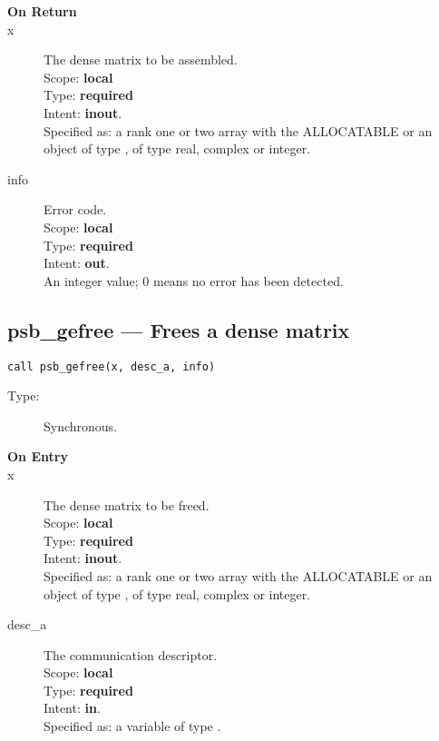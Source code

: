 \begin{description}
\item[\bf On Return]
\item[x] The dense matrix to be assembled.\\
Scope: {\bf local} \\
Type: {\bf required}\\
Intent: {\bf inout}.\\
Specified as: a rank one or two array with the ALLOCATABLE or an
object of type \vdata, of type real, complex or integer.\\
\item[info] Error code.\\
Scope: {\bf local} \\
Type: {\bf required} \\
Intent: {\bf out}.\\
An integer value; 0 means no error has been detected. 
\end{description}
%
%
\clearpage\subsection{psb\_gefree --- Frees a dense matrix}

\begin{verbatim}
call psb_gefree(x, desc_a, info)
\end{verbatim}

\begin{description}
\item[Type:] Synchronous.
\item[\bf On Entry]
\item[x] The dense matrix to
  be freed.\\
Scope: {\bf local} \\
Type: {\bf required}\\
Intent: {\bf inout}.\\
Specified as: a rank one or two array with the ALLOCATABLE or an
object of type \vdata, of type real, complex or integer.\\

\item[desc\_a] The communication descriptor.\\
Scope: {\bf local} \\
Type: {\bf required}\\
Intent: {\bf in}.\\
Specified as: a variable of type \descdata.\\
\end{description}

